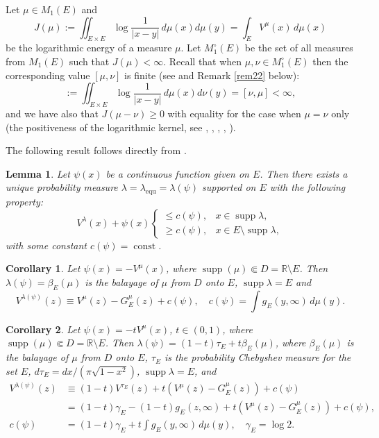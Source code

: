 \documentclass[11pt, a4paper, twoside]{article}
\let\leq\leqslant
\let\geq\geqslant
\def\RR{\mathbb R}
\def\supp{\operatorname{supp}}
\def\const{\operatorname{const}}
\def\equ{\operatorname{equ}}
\theoremstyle{plain}
\newtheorem{lemma}{Lemma}
\newtheorem{corollary}{Corollary}
\theoremstyle{definition}
\begin{document}
Let $\mu\in M_1(E)$ and 
\begin{equation}
J(\mu):=\iint_{E\times E}
\log\frac1{|x-y|}\,d\mu(x)d\mu(y)
=\int_E V^\mu(x)\,d\mu(x)
\label{enelog}
\end{equation}
be the logarithmic energy of a measure $\mu$.
Let  $M^\circ_1(E)$ be the set of all measures from $M_1(E)$ such that $J(\mu)<\infty$. 
Recall that when $\mu,\nu\in M^\circ_1(E)$ then the corresponding value $[\mu,\nu]$ is finite (see \cite[Chapter II, Section 5, p. 127, Lemma 5.4]{SaTo97} and Remark \ref{rem22} below):
\begin{equation}
[\mu,\nu]:=\iint_{E\times E}\log\frac1{|x-y|}\,d\mu(x)d\nu(y)
=[\nu,\mu]<\infty,
\label{enemut}
\end{equation}
and we have also that $J(\mu-\nu)\geq0$ with equality for the case when $\mu=\nu$ only (the positiveness of the logarithmic kernel, see  \cite{Lan66}, \cite{SaTo97}, \cite{Chi18}, \cite{Chi19}, \cite{Chi20}).

The following result follows directly from \cite[\S 3, Lemma 6]{GoRa87}.

\begin{lemma}\label{lem1} Let $\psi(x)$ be a continuous function given on $E$. Then there exists a unique probability measure $\lambda=\lambda_{\equ}=\lambda(\psi)$ supported on $E$ with the following property:
\begin{equation}
V^{\lambda}(x)+\psi(x)
\begin{cases}
\leq c(\psi),& x\in \supp{\lambda},\\
\geq c(\psi), & x\in E\setminus\supp{\lambda},
\end{cases}
\label{equpro}
\end{equation}
with some constant $c(\psi)=\const$.
\end{lemma}

\begin{corollary}\label{cor4}
Let $\psi(x)=-V^\mu(x)$, where $\supp(\mu)\Subset D=\RR\setminus{E}$.
Then $\lambda(\psi)=\beta_E(\mu)$ is the balayage of $\mu$ from $D$ onto $E$,  $\supp{\lambda}=E$ and 
\begin{equation}
V^{\lambda(\psi)}(z)\equiv
V^\mu(z)-G_E^\mu(z)+c(\psi),\quad
c(\psi)=\int g_E(y,\infty)\,d\mu(y).
\label{cpsi}
\end{equation}
\end{corollary}

\begin{corollary}\label{cor5}
Let $\psi(x)=-tV^\mu(x)$, $t\in(0,1)$, where $\supp(\mu)\Subset D=\RR\setminus{E}$. Then $\lambda(\psi)=(1-t)\tau_E+t\beta_E(\mu)$, where $\beta_E(\mu)$ is the balayage of $\mu$ from $D$ onto $E$,  $\tau_E$ is the probability  Chebyshev measure for the set $E$, $d\tau_E=dx/(\pi\sqrt{1-x^2})$, $\supp{\lambda}=E$, and 
\begin{align}
V^{\lambda(\psi)}(z)&\equiv (1-t)V^{\tau_E}(z)+t(V^\mu(z)-G_E^\mu(z))+c(\psi)\nonumber\\
&= (1-t)\gamma_E-(1-t)g_E(z,\infty)+t(V^\mu(z)-G_E^\mu(z))+c(\psi),\label{psitv}\\
c(\psi)&=(1-t)\gamma_E+t\int g_E(y,\infty)\,d\mu(y),\quad\gamma_E=\log2.\nonumber
\end{align}
\end{corollary}
\end{document}

